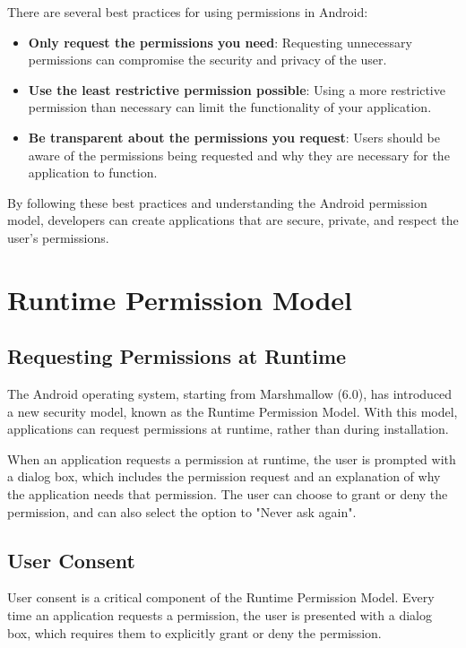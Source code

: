 \documentclass{article}
\begin{document}
There are several best practices for using permissions in Android:

\begin{itemize}
\item \textbf{Only request the permissions you need}: Requesting unnecessary permissions can compromise the security and privacy of the user.
\item \textbf{Use the least restrictive permission possible}: Using a more restrictive permission than necessary can limit the functionality of your application.
\item \textbf{Be transparent about the permissions you request}: Users should be aware of the permissions being requested and why they are necessary for the application to function.
\end{itemize}

By following these best practices and understanding the Android permission model, developers can create applications that are secure, private, and respect the user's permissions.
\section{Runtime Permission Model}
\subsection{Requesting Permissions at Runtime}

The Android operating system, starting from Marshmallow (6.0), has introduced a new security model, known as the Runtime Permission Model. With this model, applications can request permissions at runtime, rather than during installation.

When an application requests a permission at runtime, the user is prompted with a dialog box, which includes the permission request and an explanation of why the application needs that permission. The user can choose to grant or deny the permission, and can also select the option to "Never ask again".

\subsection{User Consent}

User consent is a critical component of the Runtime Permission Model. Every time an application requests a permission, the user is presented with a dialog box, which requires them to explicitly grant or deny the permission.
\end{document}
